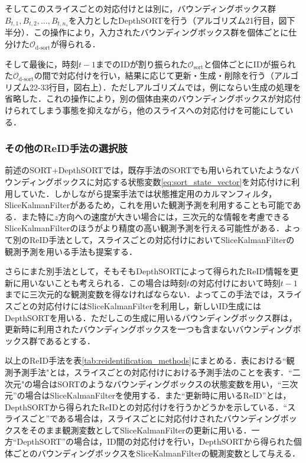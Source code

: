         そしてこのスライスごとの対応付けとは別に，バウンディングボックス群$B_{t, 1}, B_{t, 2}, \dots, B_{t, n_s}$を入力としたDepthSORTを行う（アルゴリズム21行目，図下半分）．この操作により，入力されたバウンディングボックス群を個体ごとに仕分けた$\mathcal{O}_{\text{d-sort}}$が得られる．

        そして最後に，時刻$t-1$までのIDが割り振られた$\mathcal{O}_{\text{sort}}$と個体ごとにIDが振られた$\mathcal{O}_{\text{d-sort}}$の間で対応付けを行い，結果に応じて更新・生成・削除を行う（アルゴリズム22-33行目，図右上）．ただしアルゴリズムでは，例にならい生成の処理を省略した．これの操作により，別の個体由来のバウンディングボックスが対応付けられてしまう事態を抑えながら，他のスライスへの対応付けを可能にしている．

        \subsubsection{その他のReID手法の選択肢}

        前述のSORT+DepthSORTでは，既存手法のSORTでも用いられていたようなバウンディングボックスに対応する状態変数\ref{eq:sort_state_vector}を対応付けに利用していた．しかしながら提案手法では状態推定用のカルマンフィルタ，SliceKalmanFilterがあるため，これを用いた観測予測を利用することも可能である．また特に$z$方向への速度が大きい場合には，三次元的な情報を考慮できるSliceKalmanFilterのほうがより精度の高い観測予測を行える可能性がある．よって別のReID手法として，スライスごとの対応付けにおいてSliceKalmanFilterの観測予測を用いる手法も提案する．
        
        さらにまた別手法として，そもそもDepthSORTによって得られたReID情報を更新に用いないことも考えられる．この場合は時刻$t$の対応付けにおいて時刻$t-1$までに三次元的な観測変数を得なければならない．よってこの手法では，スライスごとの対応付けにはSliceKalmanFilterを利用し，新しいID生成にはDepthSORTを用いる．ただしこの生成に用いるバウンディングボックス群は，更新時に利用されたバウンディングボックスを一つも含まないバウンディングボックス群であるとする．

        以上のReID手法を表\ref{tab:reidentification_methods}にまとめる．表における``観測予測手法"とは，スライスごとの対応付けにおける予測手法のことを表す．``二次元"の場合はSORTのようなバウンディングボックスの状態変数を用い，``三次元''の場合はSliceKalmanFilterを使用する．また``更新時に用いるReID''とは，DepthSORTから得られたReIDとの対応付けを行うかどうかを示している．``スライスごと''である場合は，スライスごとに対応付けされたバウンディングボックスをそのまま観測変数としてSliceKalmanFilterの更新に用いる．一方``DepthSORT''の場合は，ID間の対応付けを行い，DepthSORTから得られた個体ごとのバウンディングボックスをSliceKalmanFilterの観測変数として与える．

